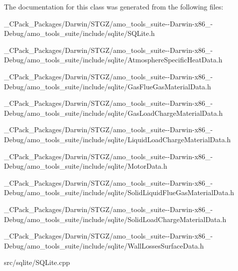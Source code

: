 The documentation for this class was generated from the following files\+:\begin{DoxyCompactItemize}
\item 
\+\_\+\+C\+Pack\+\_\+\+Packages/\+Darwin/\+S\+T\+G\+Z/amo\+\_\+tools\+\_\+suite-\/-\/\+Darwin-\/x86\+\_-\/\+Debug/amo\+\_\+tools\+\_\+suite/include/sqlite/S\+Q\+Lite.\+h\item 
\+\_\+\+C\+Pack\+\_\+\+Packages/\+Darwin/\+S\+T\+G\+Z/amo\+\_\+tools\+\_\+suite-\/-\/\+Darwin-\/x86\+\_-\/\+Debug/amo\+\_\+tools\+\_\+suite/include/sqlite/Atmosphere\+Specific\+Heat\+Data.\+h\item 
\+\_\+\+C\+Pack\+\_\+\+Packages/\+Darwin/\+S\+T\+G\+Z/amo\+\_\+tools\+\_\+suite-\/-\/\+Darwin-\/x86\+\_-\/\+Debug/amo\+\_\+tools\+\_\+suite/include/sqlite/Gas\+Flue\+Gas\+Material\+Data.\+h\item 
\+\_\+\+C\+Pack\+\_\+\+Packages/\+Darwin/\+S\+T\+G\+Z/amo\+\_\+tools\+\_\+suite-\/-\/\+Darwin-\/x86\+\_-\/\+Debug/amo\+\_\+tools\+\_\+suite/include/sqlite/Gas\+Load\+Charge\+Material\+Data.\+h\item 
\+\_\+\+C\+Pack\+\_\+\+Packages/\+Darwin/\+S\+T\+G\+Z/amo\+\_\+tools\+\_\+suite-\/-\/\+Darwin-\/x86\+\_-\/\+Debug/amo\+\_\+tools\+\_\+suite/include/sqlite/Liquid\+Load\+Charge\+Material\+Data.\+h\item 
\+\_\+\+C\+Pack\+\_\+\+Packages/\+Darwin/\+S\+T\+G\+Z/amo\+\_\+tools\+\_\+suite-\/-\/\+Darwin-\/x86\+\_-\/\+Debug/amo\+\_\+tools\+\_\+suite/include/sqlite/Motor\+Data.\+h\item 
\+\_\+\+C\+Pack\+\_\+\+Packages/\+Darwin/\+S\+T\+G\+Z/amo\+\_\+tools\+\_\+suite-\/-\/\+Darwin-\/x86\+\_-\/\+Debug/amo\+\_\+tools\+\_\+suite/include/sqlite/Solid\+Liquid\+Flue\+Gas\+Material\+Data.\+h\item 
\+\_\+\+C\+Pack\+\_\+\+Packages/\+Darwin/\+S\+T\+G\+Z/amo\+\_\+tools\+\_\+suite-\/-\/\+Darwin-\/x86\+\_-\/\+Debug/amo\+\_\+tools\+\_\+suite/include/sqlite/Solid\+Load\+Charge\+Material\+Data.\+h\item 
\+\_\+\+C\+Pack\+\_\+\+Packages/\+Darwin/\+S\+T\+G\+Z/amo\+\_\+tools\+\_\+suite-\/-\/\+Darwin-\/x86\+\_-\/\+Debug/amo\+\_\+tools\+\_\+suite/include/sqlite/Wall\+Losses\+Surface\+Data.\+h\item 
src/sqlite/S\+Q\+Lite.\+cpp\end{DoxyCompactItemize}
